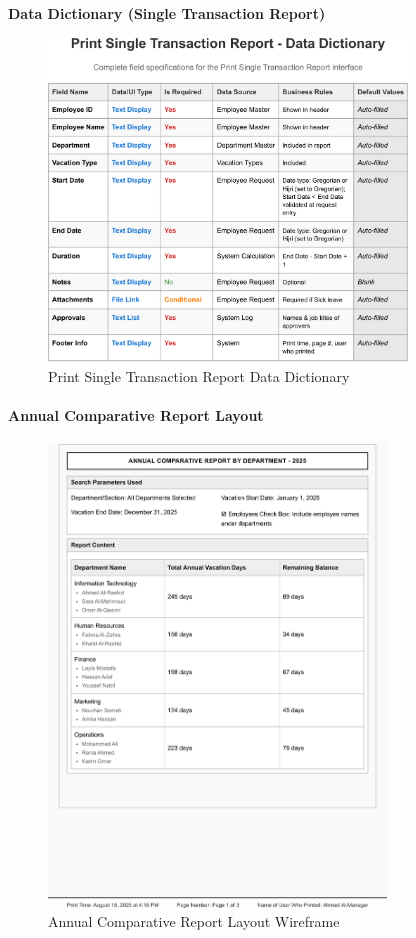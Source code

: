 \documentclass[12pt,a4paper]{article}
\begin{document}
\noindent\textbf{Data Dictionary (Single Transaction Report)}
\begin{figure}[H]
\centering
\includegraphics[width=0.85\textwidth]{Data-Dictionary/Screen-Data-Dictionaries/Print-Single-Transaction-Report-Data-Dictionary/Print-Single-Transaction-Report-Data-Dictionary-1.png}
\caption{Print Single Transaction Report Data Dictionary}
\label{fig:print-single-transaction-data-dict-inline}
\end{figure}

\paragraph{Annual Comparative Report Layout}
\begin{figure}[H]
\centering
\includegraphics[width=0.8\textwidth]{Wireframes/Print-Layout-Annual-Comparative-Report/Print-Layout-Annual-Comparative-Report-Web-1.png}
\caption{Annual Comparative Report Layout Wireframe}
\label{fig:wireframe-annual-comparative-report}
\end{figure}
\end{document}
